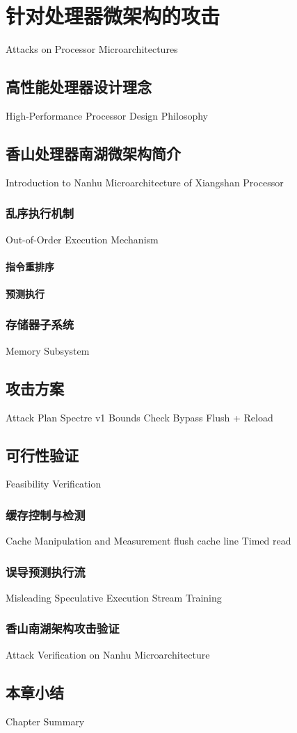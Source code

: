 
\chapter{针对处理器微架构的攻击}{Attacks on Processor Microarchitectures}


\section{高性能处理器设计理念}{High-Performance Processor Design Philosophy}
\somewords


\section{香山处理器南湖微架构简介}{Introduction to Nanhu Microarchitecture of Xiangshan Processor}
\somewords
\subsection{乱序执行机制}{Out-of-Order Execution Mechanism}
\somewords
\subsubsection{指令重排序}
\somewords
\subsubsection{预测执行}
\somewords
\subsection{存储器子系统}{Memory Subsystem}
\somewords


\section{攻击方案}{Attack Plan}
Spectre v1 Bounds Check Bypass
Flush + Reload
\somewords


\section{可行性验证}{Feasibility Verification}
\somewords
\subsection{缓存控制与检测}{Cache Manipulation and Measurement}
flush cache line
Timed read
\subsection{误导预测执行流}{Misleading Speculative Execution Stream}
Training
\subsection{香山南湖架构攻击验证}{Attack Verification on Nanhu Microarchitecture}
\somewords


\section{本章小结}{Chapter Summary}
\somewords


\newpage
